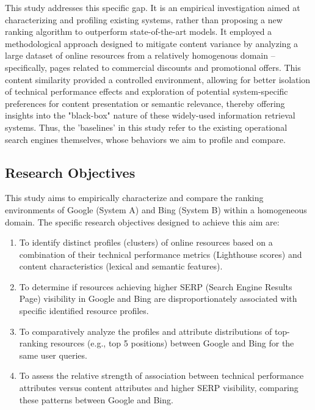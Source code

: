 \documentclass[a4paper,fleqn]{cas-sc}
\begin{document}
This study addresses this specific gap. It is an empirical investigation aimed at characterizing and profiling existing systems, rather than proposing a new ranking algorithm to outperform state-of-the-art models. It employed a methodological approach designed to mitigate content variance by analyzing a large dataset of online resources from a relatively homogenous domain – specifically, pages related to commercial discounts and promotional offers. This content similarity provided a controlled environment, allowing for better isolation of technical performance effects and exploration of potential system-specific preferences for content presentation or semantic relevance, thereby offering insights into the "black-box" nature of these widely-used information retrieval systems. Thus, the 'baselines' in this study refer to the existing operational search engines themselves, whose behaviors we aim to profile and compare.

\subsection{Research Objectives}
\label{subsec:aim}
This study aims to empirically characterize and compare the ranking environments of Google (System A) and Bing (System B) within a homogeneous domain. The specific research objectives designed to achieve this aim are:
\begin{enumerate}
\item To identify distinct profiles (clusters) of online resources based on a combination of their technical performance metrics (Lighthouse scores) and content characteristics (lexical and semantic features).
\item To determine if resources achieving higher SERP (Search Engine Results Page) visibility in Google and Bing are disproportionately associated with specific identified resource profiles.
\item To comparatively analyze the profiles and attribute distributions of top-ranking resources (e.g., top 5 positions) between Google and Bing for the same user queries.
\item To assess the relative strength of association between technical performance attributes versus content attributes and higher SERP visibility, comparing these patterns between Google and Bing.
\end{enumerate}
\end{document}
